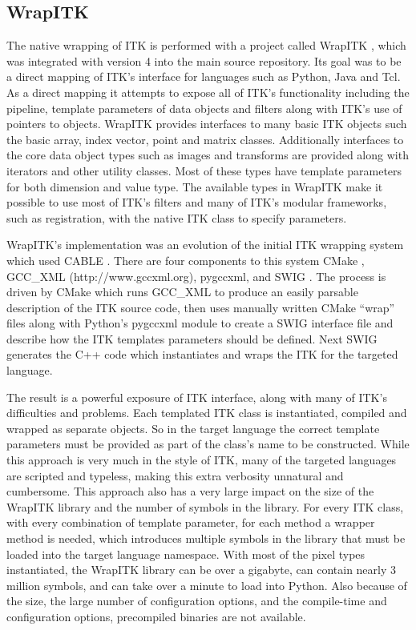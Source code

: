 \documentclass{frontiersMED} %
\begin{document}
\subsection{WrapITK}

The native wrapping of ITK is performed with a project called WrapITK
\cite{Lehmann2006}, which was integrated with version 4 into the main source
repository. Its goal was to be a direct mapping of ITK's interface for
languages such as Python, Java and Tcl. As a direct mapping it
attempts to expose all of ITK's functionality including the pipeline,
template parameters of data objects and filters along with ITK's use
of pointers to objects. WrapITK provides interfaces to many basic ITK
objects such the basic array, index vector, point and matrix
classes. Additionally interfaces to the core data object types such as
images and transforms are provided along with iterators and other
utility classes. Most of these types have template parameters for both
dimension and value type. The available types in WrapITK make it
possible to use most of ITK's filters and many of ITK's modular
frameworks, such as registration, with the native ITK class to specify
parameters.

WrapITK's implementation was an evolution of the initial ITK wrapping
system which used CABLE \cite{Lehmann2006}. There are four components to
this system CMake \cite{Martin2003}, GCC\_XML (http://www.gccxml.org), pygccxml, and SWIG
\cite{Beazley2003}. The process is driven by CMake which runs GCC\_XML to
produce an easily parsable description of the ITK source code, then
uses manually written CMake ``wrap'' files along with Python's pygccxml
module to create a SWIG interface file and describe how the ITK
templates parameters should be defined. Next SWIG generates the C++
code which instantiates and wraps the ITK for the targeted language.

The result is a powerful exposure of ITK interface, along with many of
ITK's difficulties and problems. Each templated ITK class is
instantiated, compiled and wrapped as separate objects. So in the
target language the correct template parameters must be provided as
part of the class's name to be constructed. While this approach is
very much in the style of ITK, many of the targeted languages are
scripted and typeless, making this extra verbosity unnatural and
cumbersome.  This approach also has a very large impact on the size of
the WrapITK library and the number of symbols in the library. For
every ITK class, with every combination of template parameter, for
each method a wrapper method is needed, which introduces multiple
symbols in the library that must be loaded into the target language
namespace. With most of the pixel types instantiated, the WrapITK
library can be over a gigabyte, can contain nearly 3 million symbols,
and can take over a minute to load into Python. Also because of the size,
the large number of configuration options, and the compile-time and
configuration options, precompiled binaries are not available.
\end{document}
